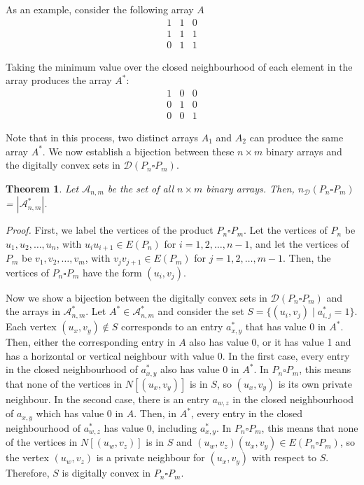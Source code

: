 \documentclass[12pt]{article}
\newtheorem{thm}{Theorem}[section]
\begin{document}
As an example, consider the following array $A$
$$\begin{array}{ccc}
1 & 1 & 0 \\
1 & 1 & 1 \\
0 & 1 & 1
\end{array}
$$

Taking the minimum value over the closed neighbourhood of each element in the array produces the array $A^*$:
$$\begin{array}{ccc}
1 & 0 & 0\\
0 & 1 & 0 \\
0 & 0 & 1
\end{array}$$

Note that in this process, two distinct arrays $A_1$ and $A_2$ can produce the same array $A^*$. We now establish a bijection between these $n\times m$ binary arrays and the digitally convex sets in $\mathscr{D}(P_n \square P_m)$. 

\begin{thm}
Let $\mathscr{A}_{n,m}$ be the set of all $n\times m$ binary arrays. Then, $n_\mathscr{D}(P_n\square P_m)$ = $|\mathscr{A}_{n,m}^*|$. 
\label{thm:pnpm}
\end{thm}

\noindent
\emph{Proof.} First, we label the vertices of the product $P_n \square P_m$. Let the vertices of $P_n$ be $u_1,u_2,\dots,u_n$, with $u_i u_{i+1}\in E(P_n)$ for $i=1,2,\dots,n-1$, and let the vertices of $P_m$ be $v_1,v_2,\dots,v_m$, with $v_jv_{j+1}\in E(P_m)$ for $j=1,2,\dots,m-1$. Then, the vertices of $P_n\square P_m$ have the form $(u_i,v_j)$. 

Now we show a bijection between the digitally convex sets in $\mathscr{D}(P_n\square P_m)$ and the arrays in $\mathscr{A}_{n,m}^*$. Let $A^* \in \mathscr{A}_{n,m}^*$ and consider the set $S = \{(u_i,v_j)\mid a^*_{i,j}=1\}$. Each vertex $(u_x,v_y)\not\in S$ corresponds to an entry $a^*_{x,y}$ that has value 0 in $A^*$. Then, either the corresponding entry in $A$ also has value 0, or it has value 1 and has a horizontal or vertical neighbour with value 0. In the first case, every entry in the closed neighbourhood of $a^*_{x,y}$ also has value 0 in $A^*$. In $P_n \square P_m$, this means that none of the vertices in $N[(u_x,v_y)]$ is in $S$, so $(u_x,v_y)$ is its own private neighbour. In the second case, there is an entry $a_{w,z}$ in the closed neighbourhood of $a_{x,y}$ which has value 0 in $A$. Then, in $A^*$, every entry in the closed neighbourhood of $a^*_{w,z}$ has value 0, including $a^*_{x,y}$. In $P_n\square P_m$, this means that none of the vertices in $N[(u_w,v_z)]$ is in $S$ and $(u_w,v_z)(u_x,v_y)\in E(P_n\square P_m)$, so the vertex $(u_w,v_z)$ is a private neighbour for $(u_x,v_y)$ with respect to $S$. Therefore, $S$ is digitally convex in $P_n \square P_m$. 
\end{document}
